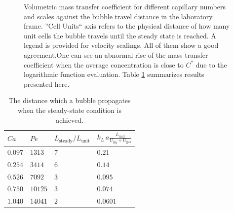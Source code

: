 \documentclass[review,12pt]{elsarticle}
\newcommand{\vol}{k_L\,a}
\newcommand{\lunit}{L_{\mathrm{unit}}}
\newcommand{\uliq}{U_{\mathrm{liq}}}
\newcommand{\ugas}{U_{\mathrm{gas}}}
\newcommand{\cstar}{C^{*}}
\newcommand{\volnondim}{\vol \frac{\lunit}{\uliq+\ugas}}
\begin{document}
\begin{figure}[htb!]
\caption{Volumetric mass transfer coefficient for different capillary numbers and scales against the
bubble travel distance in the laboratory frame. ''Cell Units`` axis refers to the physical
distance of how many unit cells the bubble travels until the steady state is reached. A legend is provided for velocity scalings. All of them show a good agreement.One can see an abnormal rise of the mass transfer coefficient when the average concentration is close to $\cstar$ due to the logarithmic function evaluation.  Table
\ref{table:steady:state:average}
summarizes results presented here.  \label{fig:aver:conc:different:capillaries}}
\end{figure}
\begin{table}[htb!]
\begin{tabularx}{\textwidth}{|X|X|X|X|}
\hline
$Ca$    &$Pe$     &$L_{\mathrm{steady}}/\lunit$& $\volnondim$ \\
\hline
$0.097$ &$1313$  &$7$&$0.21$  \\ 
$0.254$ &$3414$  &$6$&$0.14$  \\ 
$0.526$ &$7092$  &$3$&$0.095$ \\
$0.750$ &$10125$ &$3$&$0.074$ \\
$1.040$ &$14041$ &$2$&$0.0601$\\
\hline
\end{tabularx}
\caption{The distance which a bubble propagates when the
steady-state condition is achieved. 
\label{table:steady:state:average}}
\end{table}
\end{document}
